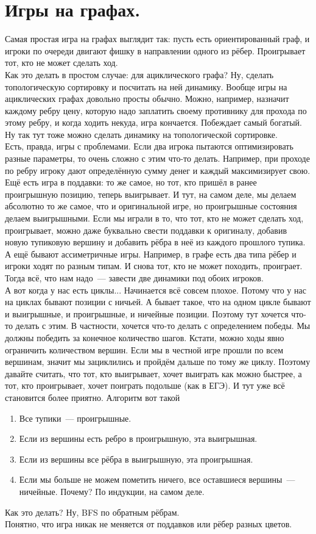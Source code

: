 \documentclass{article}
\begin{document}
    \section{Игры на графах.}
    Самая простая игра на графах выглядит так: пусть есть ориентированный граф, и игроки по очереди двигают фишку в направлении одного из рёбер. Проигрывает тот, кто не может сделать ход.\\
    Как это делать в простом случае: для ациклического графа? Ну, сделать топологическую сортировку и посчитать на ней динамику. Вообще игры на ациклических графах довольно просты обычно. Можно, например, назначит каждому ребру цену, которую надо заплатить своему противнику для прохода по этому ребру, и когда ходить некуда, игра кончается. Побеждает самый богатый. Ну так тут тоже можно сделать динамику на топологической сортировке.\\
    Есть, правда, игры с проблемами. Если два игрока пытаются оптимизировать разные параметры, то очень сложно с этим что-то делать. Например, при проходе по ребру игроку дают определённую сумму денег и каждый максимизирует свою.\\
    Ещё есть игра в поддавки: то же самое, но тот, кто пришёл в ранее проигрышную позицию, теперь выигрывает. И тут, на самом деле, мы делаем абсолютно то же самое, что и оригинальной игре, но проигрышные состояния делаем выигрышными. Если мы играли в то, что тот, кто не может сделать ход, проигрывает, можно даже буквально свести поддавки к оригиналу, добавив новую тупиковую вершину и добавить рёбра в неё из каждого прошлого тупика.\\
    А ещё бывают ассиметричные игры. Например, в графе есть два типа рёбер и игроки ходят по разным типам. И снова тот, кто не может походить, проиграет. Тогда всё, что нам надо~--- завести две динамики под обоих игроков.\\
    А вот когда у нас есть циклы... Начинается всё совсем плохое. Потому что у нас на циклах бывают позиции с ничьей. А бывает такое, что на одном цикле бывают и выигрышные, и проигрышные, и ничейные позиции. Поэтому тут хочется что-то делать с этим. В частности, хочется что-то делать с определением победы. Мы должны победить за конечное количество шагов. Кстати, можно ходы явно ограничить количеством вершин. Если мы в честной игре прошли по всем вершинам, значит мы зациклились и пройдём дальше по тому же циклу. Поэтому давайте считать, что тот, кто выигрывает, хочет выиграть как можно быстрее, а тот, кто проигрывает, хочет поиграть подольше (как в ЕГЭ). И тут уже всё становится более приятно. Алгоритм вот такой
    \begin{enumerate}
        \item Все тупики~--- проигрышные.
        \item Если из вершины есть ребро в проигрышную, эта выигрышная.
        \item Если из вершины все рёбра в выигрышную, эта проигрышная.
        \item Если мы больше не можем пометить ничего, все оставшиеся вершины~--- ничейные. Почему? По индукции, на самом деле.
    \end{enumerate}
    Как это делать? Ну, BFS по обратным рёбрам.\\
    Понятно, что игра никак не меняется от поддавков или рёбер разных цветов.
\end{document}
